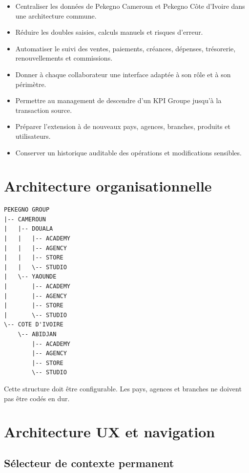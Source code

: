 \documentclass[11pt,a4paper]{article}
\begin{document}
\begin{itemize}
  \item Centraliser les données de Pekegno Cameroun et Pekegno Côte d'Ivoire dans une architecture commune.
  \item Réduire les doubles saisies, calculs manuels et risques d'erreur.
  \item Automatiser le suivi des ventes, paiements, créances, dépenses, trésorerie, renouvellements et commissions.
  \item Donner à chaque collaborateur une interface adaptée à son rôle et à son périmètre.
  \item Permettre au management de descendre d'un KPI Groupe jusqu'à la transaction source.
  \item Préparer l'extension à de nouveaux pays, agences, branches, produits et utilisateurs.
  \item Conserver un historique auditable des opérations et modifications sensibles.
\end{itemize}

\section{Architecture organisationnelle}

\begin{verbatim}
PEKEGNO GROUP
|-- CAMEROUN
|   |-- DOUALA
|   |   |-- ACADEMY
|   |   |-- AGENCY
|   |   |-- STORE
|   |   \-- STUDIO
|   \-- YAOUNDE
|       |-- ACADEMY
|       |-- AGENCY
|       |-- STORE
|       \-- STUDIO
\-- COTE D'IVOIRE
    \-- ABIDJAN
        |-- ACADEMY
        |-- AGENCY
        |-- STORE
        \-- STUDIO
\end{verbatim}

Cette structure doit être configurable. Les pays, agences et branches ne doivent pas être codés en dur.

\section{Architecture UX et navigation}

\subsection{Sélecteur de contexte permanent}
\end{document}
